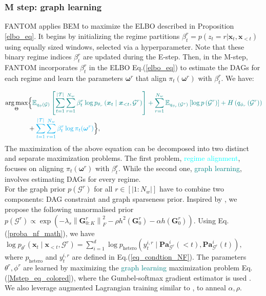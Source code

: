 \subsubsection{M step: graph learning}
\label{sec_Mstep}
FANTOM applies BEM to maximize the ELBO described in Proposition \ref{elbo_eq}. It begins by initializing the regime partitions $\beta^r_{t} = p( z_t = r  | \boldsymbol{x}_t, \boldsymbol{x}_{<t})$ using equally sized windows, selected via a hyperparameter. Note that these binary regime indices $\beta^r_{t}$ are updated during the E-step. Then, in the M-step, FANTOM incorporates $\beta^r_{t}$ in the ELBO Eq.(\ref{elbo_eq}) to estimate the DAGs for each regime and learn the parameters $\boldsymbol{\omega}^r$ that align $\pi_t(\boldsymbol{\omega}^{r})$ with $\beta^r_{t}$. We have:

\begin{equation}
\begin{aligned}
       \operatorname*{arg\,max}_{\Theta}&  \Big\{\color{teal}\mathbb{E}_{q_\phi\left(\mathcal{G}\right)}\left[\sum_{t=1}^{|\mathcal{T}|} \sum_{r=1}^{N_w}\beta^r_{t}\log p_{\theta_{r}}\left(\boldsymbol{x}_t\mid \boldsymbol{x}_{<t}, \mathcal{G}^{r}\right)\right]+\sum_{r=1}^{N_w} \mathbb{E}_{q_{\phi_r}\left(\mathcal{G}^r\right)}\left[\log p\left(\mathcal{G}^r\right)\right]+H\left(q_{\phi_r}\left(\mathcal{G}^r\right)\right)\\
       &+ \color{cyan}\sum_{t=1}^{|\mathcal{T}|} \sum_{r=1}^{N_w}\beta^r_{t}\log \pi_t(\boldsymbol{\omega}^{r})\color{black}\Big\},
\end{aligned}
\label{Mstep_eq_colored}
\end{equation}
The maximization of the above equation can be decomposed into two distinct and separate maximization problems. The first problem, \textcolor{cyan}{regime alignment}, focuses on aligning $\pi_t(\boldsymbol{\omega}^{r})$ with $\beta^r_{t}$. While the second one, \textcolor{teal}{graph learning}, involves estimating DAGs for every regime.\\
For the graph prior $p\left(\mathcal{G}^r\right)$ for all $r \in [|1:N_w|]$ have to combine two components: DAG constraint and graph sparseness prior. Inspired by \citep{zheng2018dags, gong2022rhino, geffner2022deep}, we propose the following unnormalised prior $
p\left(\mathcal{G}^r\right) \propto \exp \left(-\lambda_s\left\|\boldsymbol{G}^r_{0: K}\right\|_F^2-\rho h^2\left(\boldsymbol{G}^r_0\right)-\alpha h\left(\boldsymbol{G}^r_0\right)\right).
$ Using Eq.(\ref{proba_nf_math}), we have
$
     \log p_{\theta^{r}}\left(\boldsymbol{x}_t\mid \boldsymbol{x}_{<t}, \mathcal{G}^{r}\right)= \sum_{i=1}^{d} \log p_{\text{hetero}}\left(y_t^{i,r} \mid \mathbf{P a}_{\mathcal{G}^r}^i(<t), \mathbf{P a}_{\mathcal{G}^r}^i(t)\right),
$ where $p_{\text{hetero}}$ and $y_t^{i,r}$ are defined in Eq.(\ref{eq_condtion_NF}). The parameters $\theta^r, \phi^r$ are learned by maximizing the \textcolor{teal}{graph learning} maximization problem Eq.(\ref{Mstep_eq_colored}), where the Gumbel-softmax gradient estimator is used \citep{jang2016categorical}. We also leverage augmented Lagrangian
training similar to \citep{pamfil2020dynotears, rahmanicausal, geffner2022deep}, to anneal $\alpha, \rho$.
